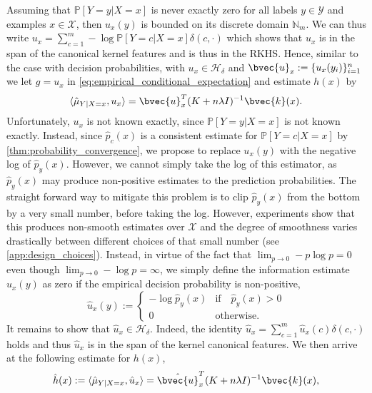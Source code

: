 \documentclass{article}
\begin{document}
		Assuming that $\mathbb{P}[Y = y | X = x]$ is never exactly zero for all labels $y \in \mathcal{Y}$ and examples $x \in \mathcal{X}$, then $u_{x}(y)$ is bounded on its discrete domain $\mathbb{N}_{m}$. We can thus write $u_{x} = \sum_{c = 1}^{m} - \log{\mathbb{P}[Y = c | X = x]} \delta(c, \cdot)$ which shows that $u_{x}$ is in the span of the canonical kernel features and is thus in the RKHS. Hence, similar to the case with decision probabilities, with $u_{x} \in \mathcal{H}_{\delta}$ and $\bvec{u}_{x} := \{u_{x}(y_{i})\}_{i = 1}^{n}$ we let $g = u_{x}$ in \eqref{eq:empirical_conditional_expectation} and estimate $h(x)$ by
		\begin{equation}
		\langle \hat{\mu}_{Y | X = x}, u_{x} \rangle = \bvec{u}_{x}^{T} (K + n \lambda I)^{-1} \bvec{k}(x).
		\end{equation}
		Unfortunately, $u_{x}$ is not known exactly, since $\mathbb{P}[Y = y | X = x]$ is not known exactly. Instead, since $\hat{p}_{c}(x)$ is a consistent estimate for $\mathbb{P}[Y = c | X = x]$ by \cref{thm:probability_convergence}, we propose to replace $u_{x}(y)$ with the negative log of $\hat{p}_{y}(x)$. However, we cannot simply take the log of this estimator, as $\hat{p}_{y}(x)$ may produce non-positive estimates to the prediction probabilities. The straight forward way to mitigate this problem is to clip $\hat{p}_{y}(x)$ from the bottom by a very small number, before taking the log. However, experiments show that this produces non-smooth estimates over $\mathcal{X}$ and the degree of smoothness varies drastically between different choices of that small number (see \cref{app:design_choices}). Instead, in virtue of the fact that $\lim_{p \to 0} - p \log{p} = 0$ even though $\lim_{p \to 0} - \log{p} = \infty$, we simply define the information estimate $\hat{u}_{x}(y)$ as zero if the empirical decision probability is non-positive,
		\begin{equation}
		\hat{u}_{x}(y) := \begin{cases}
		- \log{\hat{p}_{y}(x)} & \mathrm{if } \quad \hat{p}_{y}(x) > 0 \\
		0 & \mathrm{otherwise}. \end{cases}
		\label{eq:empirical_information}
		\end{equation}
		It remains to show that $\hat{u}_{x} \in \mathcal{H}_{\delta}$. Indeed, the identity $\hat{u}_{x} = \sum_{c = 1}^{m} \hat{u}_{x}(c) \delta(c, \cdot)$ holds and thus $\hat{u}_{x}$ is in the span of the kernel canonical features. We then arrive at the following estimate for $h(x)$,
		\begin{equation}
		\hat{h}(x) := \langle \hat{\mu}_{Y | X = x}, \hat{u}_{x} \rangle = \hat{\bvec{u}}_{x}^{T} (K + n \lambda I)^{-1} \bvec{k}(x),
		\label{eq:empirical_information_entropy}
		\end{equation}
\end{document}
